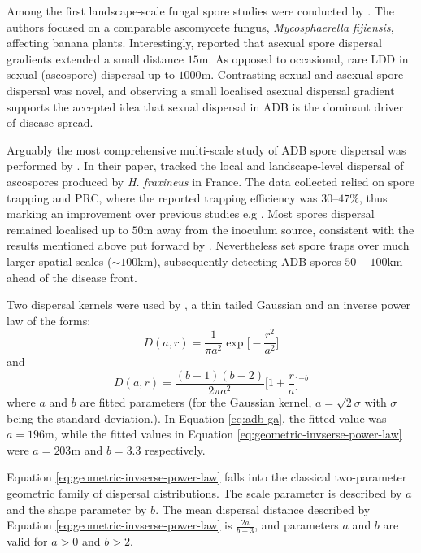Among the first landscape-scale fungal spore studies were conducted by \cite{long-range-dispersal}.
The authors focused on a comparable ascomycete fungus, \textit{Mycosphaerella fijiensis}, affecting banana plants.
Interestingly, \cite{long-range-dispersal} reported that asexual spore dispersal gradients extended 
a small distance $15\mathrm{m}$. As opposed to occasional, rare LDD in sexual (ascospore) dispersal up to $1000\mathrm{m}$.
Contrasting sexual and asexual spore dispersal was novel, and observing a small localised asexual dispersal gradient supports
the accepted idea that sexual dispersal in ADB is the dominant driver of disease spread.

Arguably the most comprehensive multi-scale study of ADB spore dispersal was performed by \cite{grosdidier2018tracking}.
In their paper, \cite{grosdidier2018tracking} tracked the local and landscape-level dispersal of ascospores
produced by \textit{H. fraxineus} in France.
The data collected relied on spore trapping and PRC, where the reported trapping efficiency was $30–47\%$, thus marking an improvement over previous studies
e.g \cite{chandelier2014detection}. Most spores dispersal remained localised up to $50\mathrm{m}$ away from the inoculum source,
consistent with the results mentioned above put forward by \cite{chandelier2014detection}.
Nevertheless \cite{grosdidier2018tracking} set spore traps over much larger spatial scales ($\sim 100\mathrm{km}$),
subsequently detecting ADB spores $50-100\mathrm{km}$ ahead of the disease front.

Two dispersal kernels were used by \cite{grosdidier2018tracking}, a thin tailed Gaussian and an inverse 
power law of the forms:
\begin{equation}
    D(a, r) = \frac{1}{\pi a^2}\exp\big[-\frac{r^2}{a^2}\big]
    \label{eq:adb-ga}
\end{equation}
and
\begin{equation}
    D(a, r) = \frac{(b-1)(b-2)}{2\pi a^2}\big[ 1+ \frac{r}{a}\big]^{-b}
    \label{eq:geometric-invserse-power-law}
\end{equation}
where $a$ and $b$ are fitted parameters (for the Gaussian kernel, $a=\sqrt{2}\sigma$ with $\sigma$ being the standard deviation.).
In Equation \ref{eq:adb-ga}, the fitted value was $a=196\mathrm{m}$, while the fitted values in
Equation \ref{eq:geometric-invserse-power-law} were $a=203\mathrm{m}$ and $b=3.3$ respectively.

Equation \ref{eq:geometric-invserse-power-law} falls into the classical two-parameter geometric family of dispersal distributions.
The scale parameter is described by $a$ and the shape parameter by $b$. The mean dispersal distance described by Equation
\ref{eq:geometric-invserse-power-law} is $\frac{2a}{b-3}$, and parameters $a$ and $b$ are valid for $a>0$ and $b>2$.

